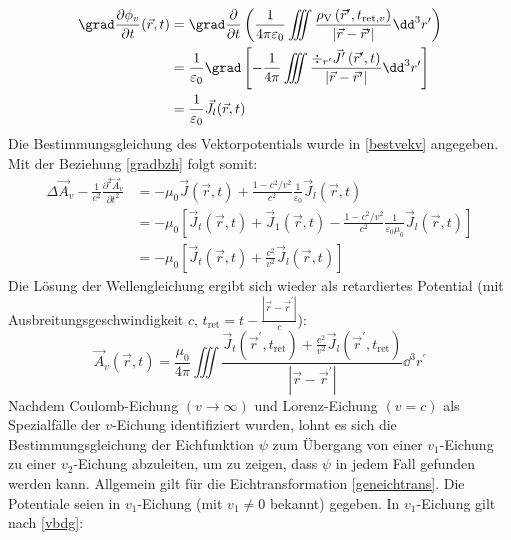 \begin{align}
	\grad \frac{\partial \phi_{{v}}}{\partial {t}}(\vec{{r}}, {t}) & =\grad \frac{\partial}{\partial {t}}\left(\frac{1}{4 \pi \varepsilon_{0}} \iiint \frac{\rho_\text{V}\left(\vec{{r}}^{\prime}, {t}_{\text{ret}, {v}}\right)}{\left|\vec{{r}}-\vec{{r}}^{\prime}\right|} \dd^3 {r}^{\prime}\right) \nonumber\\
	& =\frac{1}{\varepsilon_{0}} \grad\left[-\frac{1}{4 \pi} \iiint \frac{\div_{{r}^{\prime}} \vec{{J}}^{\prime}\left(\vec{{r}}^{\prime}, {t}\right)}{\left|\vec{{r}}-\vec{{r}}^{\prime}\right|} \dd^3 {r}^{\prime}\right] \label{gradbzh} \\
	& =\frac{1}{\varepsilon_{0}} \vec{{J}}_{l}(\vec{{r}}, {t}) \nonumber
\end{align}
 Die Bestimmungsgleichung des Vektorpotentials wurde in \ref{bestvekv} angegeben.  Mit der Beziehung \ref{gradbzh} folgt somit:
\begin{align*}
	\Delta \vec{{A}}_{{v}}-\frac{1}{{c}^{2}} \frac{\partial^{2} \vec{{A}}_{{v}}}{\partial {t}^{2}} & =-\mu_{0} \vec{{J}}(\vec{{r}}, {t})+\frac{1-{c}^{2} / {v}^{2}}{{c}^{2}} \frac{1}{\varepsilon_{0}} \vec{{J}}_{l}(\vec{{r}}, {t}) \\
	& =-\mu_{0}\left[\vec{{J}}_{{t}}(\vec{{r}}, {t})+\vec{{J}}_{1}(\vec{{r}}, {t})-\frac{1-{c}^{2} / {v}^{2}}{{c}^{2}} \frac{1}{\varepsilon_{0} \mu_{0}} \vec{{J}}_{l}(\vec{{r}}, {t})\right]  \\
	& =-\mu_{0}\left[\vec{{J}}_{{t}}(\vec{{r}}, {t})+\frac{{c}^{2}}{{v}^{2}} \vec{{J}}_{l}(\vec{{r}}, {t})\right]
\end{align*}
 Die Lösung der Wellengleichung ergibt sich wieder als retardiertes Potential (mit Ausbreitungsgeschwindigkeit $c$, $t_{\text{ret}}={t}-\frac{\left|\vec{{r}}-\vec{{r}}^{\prime}\right|}{{c}}$):
\begin{equation}\label{vekpotv}
\boxed{	\vec{{A}}_{{v}}(\vec{{r}}, {t})=\frac{\mu_{0}}{4 \pi} \iiint \frac{\vec{{J}}_{{t}}\left(\vec{{r}}^{\prime}, {t}_{\text{ret}}\right)+\frac{{c}^{2}}{{v}^{2}} \vec{{J}}_{{l}}\left(\vec{{r}}^{\prime}, {t}_{\text{ret}}\right)}{\left|\vec{{r}}-\vec{{r}}^{\prime}\right|} \dd^3 {r}^{\prime} }
\end{equation}
Nachdem Coulomb-Eichung $({v} \rightarrow \infty)$ und Lorenz-Eichung $({v}={c})$ als Spezialfälle der $v$-Eichung identifiziert wurden, lohnt es sich die Bestimmungsgleichung der Eichfunktion $\psi$ zum Übergang von einer ${v}_{1}$-Eichung zu einer ${v}_{2}$-Eichung abzuleiten, um zu zeigen, dass $\psi$ in jedem Fall gefunden werden kann. Allgemein gilt für die Eichtransformation \ref{geneichtrans}. Die Potentiale seien in ${v}_{1}$-Eichung (mit ${v}_{1} \neq 0$ bekannt) gegeben. In ${v}_{1}$-Eichung gilt nach \ref{vbdg}:
